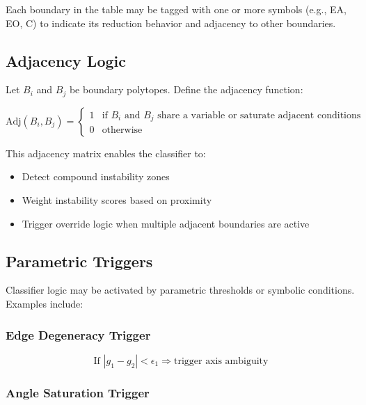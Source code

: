 \documentclass[preprint]{iucr}              %
\begin{document}
Each boundary in the table may be tagged with one or more symbols (e.g., EA, EO, C) to indicate its reduction behavior and adjacency to other boundaries.

\subsection*{Adjacency Logic}

Let $B_i$ and $B_j$ be boundary polytopes. Define the adjacency function:





\[
\text{Adj}(B_i, B_j) =
\begin{cases}
	1 & \text{if } B_i \text{ and } B_j \text{ share a variable or saturate adjacent conditions} \\
	0 & \text{otherwise}
\end{cases}
\]






This adjacency matrix enables the classifier to:

\begin{itemize}
\item Detect compound instability zones
\item Weight instability scores based on proximity
\item Trigger override logic when multiple adjacent boundaries are active
\end{itemize}

\subsection*{Parametric Triggers}

Classifier logic may be activated by parametric thresholds or symbolic conditions. Examples include:

\subsubsection*{Edge Degeneracy Trigger}



\[
\text{If } |g_1 - g_2| < \epsilon_1 \Rightarrow \text{trigger axis ambiguity}
\]



\subsubsection*{Angle Saturation Trigger}
\end{document}
